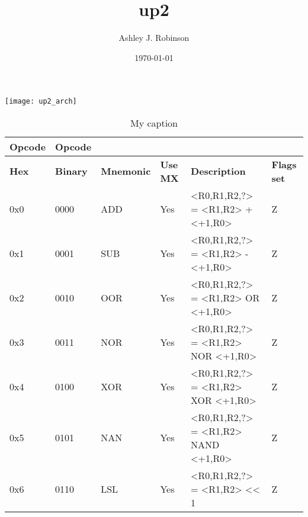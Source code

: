 \documentclass[a4paper]{article}
\title{up2}
\author{Ashley J. Robinson}
\date{\today}
\begin{document}
\maketitle

\section{}

\texttt{[image: up2\_arch]}

\begin{table}[]
    \centering
    \caption{My caption}
    \label{my-label}
    \begin{tabular}{|l|l|l|l|l|l|}
        \hline
        \textbf{Opcode}     &   \textbf{Opcode} &                       &                       &                                           &                           \\ \hline  
        \textbf{Hex}        &   \textbf{Binary} &   \textbf{Mnemonic}   &   \textbf{Use MX}     &   \textbf{Description}                    &   \textbf{Flags set}      \\ \hline  
        0x0                 &   0000            &   ADD                 &   Yes                 &   <R0,R1,R2,?> = <R1,R2> + <+1,R0>        &   Z                       \\ \hline  
        0x1                 &   0001            &   SUB                 &   Yes                 &   <R0,R1,R2,?> = <R1,R2> - <+1,R0>        &   Z                       \\ \hline  
        0x2                 &   0010            &   OOR                 &   Yes                 &   <R0,R1,R2,?> = <R1,R2> OR <+1,R0>       &   Z                       \\ \hline  
        0x3                 &   0011            &   NOR                 &   Yes                 &   <R0,R1,R2,?> = <R1,R2> NOR <+1,R0>      &   Z                       \\ \hline  
        0x4                 &   0100            &   XOR                 &   Yes                 &   <R0,R1,R2,?> = <R1,R2> XOR <+1,R0>      &   Z                       \\ \hline  
        0x5                 &   0101            &   NAN                 &   Yes                 &   <R0,R1,R2,?> = <R1,R2> NAND <+1,R0>     &   Z                       \\ \hline 
        0x6                 &   0110            &   LSL                 &   Yes                 &   <R0,R1,R2,?> = <R1,R2> << 1             &   Z                       \\ \hline 

\end{tabular}
\end{table}
\end{document}
